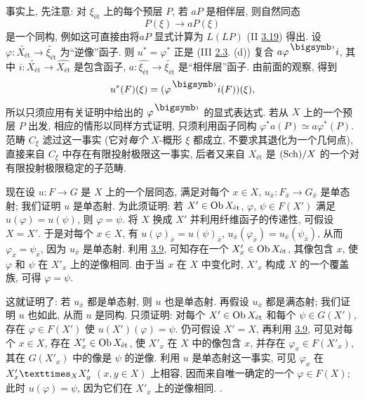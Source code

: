 事实上, 先注意: 对 $\xi_{\text{ét}}$ 上的每个预层 $P$,
若 $aP$ 是相伴层, 则自然同态
$$
P(\xi) \to aP(\xi)
$$
是一个同构, 例如这可直接由将\pageoriginale $aP$ 显式计算为 $L(LP)$
(II \hyperref[II.theo3.4]{3.19}) 得出.
设 $\varphi : \widetilde{X_{\text{ét}}} \to \widetilde{\xi_{\text{ét}}}$
为“逆像”函子. 则 $u^{\ast} = \varphi^{\ast}$
正是 (III \hyperref[III.prop2.3]{2.3}. (d)) 复合 $a\varphi^{\bigdot} i$,
其中 $i : \widetilde{X_{\text{ét}}} \to \widehat{X_{\text{ét}}}$
是包含函子, $a : \widehat{\xi_{\text{ét}}} \to
\widetilde{\xi_{\text{ét}}}$ 是“相伴层”函子.
由前面的观察, 得到
$$
u^{\ast} (F) (\xi) = (\varphi^{\bigdot} i(F)) (\xi){\quoi},
$$
所以只须应用有关证明中给出的 $\varphi^{\bigdot}$ 的显式表达式.
若从 $X$ 上的一个预层 $P$ 出发, 相应的情形以同样方式证明,
只须利用函子同构 $\varphi^{\ast} a(P) \simeq a
\varphi^{\ast} (P)$.
范畴 $C_{\xi}$ 滤过这一事实
(它对\emph{每个} $X$-概形 $\xi$ 都成立, 不要求其退化为一个几何点),
直接来自 $C_{\xi}$ 中存在有限投射极限这一事实,
后者又来自 $X_{\text{ét}}$ 是 $(\operatorname{Sch}) /X$ 的一个对有限投射极限稳定的子范畴.

现在设 $u : F \to G$ 是 $X$ 上的一个层同态,
满足对每个 $x \in X$, $u_{\bar{x}} : F_{\bar{x}} \to G_{\bar{x}}$ 是单态射;
我们证明 $u$ 是单态射.
为此须证明: 若 $X'\in \operatorname{Ob} X_{\text{ét}}$,
$\varphi$, $\psi \in F(X')$ 满足 $u (\varphi) = u (\psi)$,
则 $\varphi = \psi$.
将 $X$ 换成 $X'$ 并利用纤维函子的传递性,
可假设 $X = X'$.
于是对每个 $x \in X$, 有 $u (\varphi)_{\bar{x}} = u (\psi)_{\bar{x}}$,
\ie $u_{\bar{x}} (\varphi_{\bar{x}}) = u_{\bar{x}} (\psi_{\bar{x}})$,
从而 $\varphi_{\bar{x}} = \psi_{\bar{x}}$,
因为 $u_{\bar{x}}$ 是单态射.
利用 \hyperref[VIII.prop3.9]{3.9}, %
可知存在一个 $X'_x \in \operatorname{Ob} X_{\text{ét}}$, 其像包含 $x$,
使 $\varphi$ 和 $\psi$ 在 $X'_x$ 上的逆像相同.
由于当 $x$ 在 $X$ 中变化时, $X'_x$ 构成 $X$ 的一个覆盖族,
可得 $\varphi = \psi$.

这就\pageoriginale 证明了: 若 $u_{\bar{x}}$ 都是单态射, 则 $u$ 也是单态射.
再假设 $u_{\bar{x}}$ 都是满态射; 我们证明 $u$ 也如此, 从而 $u$ 是同构.
只须证明: 对每个 $X'\in \operatorname{Ob} X_{\text{ét}}$ 和每个 $\psi \in G (X')$,
存在 $\varphi \in F(X')$ 使 $u(X') (\varphi) = \psi$.
仍可假设 $X'= X$, 再利用 \hyperref[VIII.prop3.9]{3.9}, %
可见对每个 $x \in X$, 存在 $X'_x \in \operatorname{Ob} X_{\text{ét}}$,
使 $X'_x$ 在 $X$ 中的像包含 $x$,
并存在 $\varphi_x \in F(X'_x)$,
其在 $G (X'_x)$ 中的像是 $\psi$ 的逆像.
利用 $u$ 是单态射这一事实,
可见 $\varphi_{x}$ 在 $\fprod{X'_x}{X'_y}{X}$ $(x, y \in X)$ 上相容,
因而来自唯一确定的一个 $\varphi \in F (X)$;
此时 $u(\varphi) = \psi$, 因为它们在 $X'_{x}$ 上的逆像相同. \cqfd.

